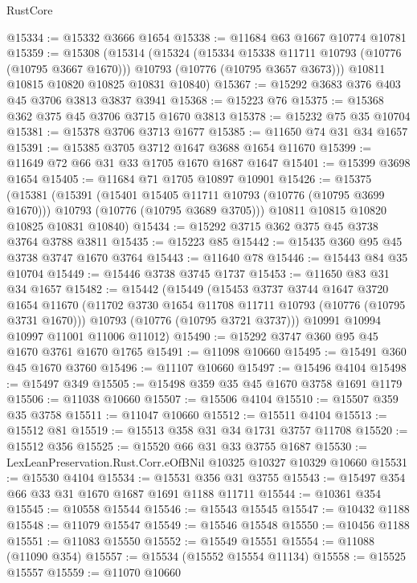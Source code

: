 \begin{lexlean}{RustCore}
\begin{coremodule}
@15334 := @15332 @3666 @1654
@15338 := @11684 @63 @1667 @10774 @10781
@15359 := @15308
    (@15314
      (@15324
        (@15334 @15338 @11711 @10793 (@10776 (@10795 @3667 @1670)))
        @10793
        (@10776 (@10795 @3657 @3673)))
      @10811
      @10815
      @10820
      @10825
      @10831
      @10840)
@15367 := @15292 @3683 @376 @403 @45 @3706 @3813 @3837 @3941
@15368 := @15223 @76
@15375 := @15368 @362 @375 @45 @3706 @3715 @1670 @3813
@15378 := @15232 @75 @35 @10704
@15381 := @15378 @3706 @3713 @1677
@15385 := @11650 @74 @31 @34 @1657
@15391 := @15385 @3705 @3712 @1647 @3688 @1654 @11670
@15399 := @11649 @72 @66 @31 @33 @1705 @1670 @1687 @1647
@15401 := @15399 @3698 @1654
@15405 := @11684 @71 @1705 @10897 @10901
@15426 := @15375
    (@15381
      (@15391
        (@15401 @15405 @11711 @10793 (@10776 (@10795 @3699 @1670)))
        @10793
        (@10776 (@10795 @3689 @3705)))
      @10811
      @10815
      @10820
      @10825
      @10831
      @10840)
@15434 := @15292 @3715 @362 @375 @45 @3738 @3764 @3788 @3811
@15435 := @15223 @85
@15442 := @15435 @360 @95 @45 @3738 @3747 @1670 @3764
@15443 := @11640 @78
@15446 := @15443 @84 @35 @10704
@15449 := @15446 @3738 @3745 @1737
@15453 := @11650 @83 @31 @34 @1657
@15482 := @15442
    (@15449
      (@15453
        @3737
        @3744
        @1647
        @3720
        @1654
        @11670
        (@11702 @3730 @1654 @11708 @11711 @10793 (@10776 (@10795 @3731 @1670)))
        @10793
        (@10776 (@10795 @3721 @3737)))
      @10991
      @10994
      @10997
      @11001
      @11006
      @11012)
@15490 := @15292 @3747 @360 @95 @45 @1670 @3761 @1670 @1765
@15491 := @11098 @10660
@15495 := @15491 @360 @45 @1670 @3760
@15496 := @11107 @10660
@15497 := @15496 @4104
@15498 := @15497 @349
@15505 := @15498 @359 @35 @45 @1670 @3758 @1691 @1179
@15506 := @11038 @10660
@15507 := @15506 @4104
@15510 := @15507 @359 @35 @3758
@15511 := @11047 @10660
@15512 := @15511 @4104
@15513 := @15512 @81
@15519 := @15513 @358 @31 @34 @1731 @3757 @11708
@15520 := @15512 @356
@15525 := @15520 @66 @31 @33 @3755 @1687
@15530 := LexLeanPreservation.Rust.Corr.eOfBNil @10325 @10327 @10329 @10660
@15531 := @15530 @4104
@15534 := @15531 @356 @31 @3755
@15543 := @15497 @354 @66 @33 @31 @1670 @1687 @1691 @1188 @11711
@15544 := @10361 @354
@15545 := @10558 @15544
@15546 := @15543 @15545
@15547 := @10432 @1188
@15548 := @11079 @15547
@15549 := @15546 @15548
@15550 := @10456 @1188
@15551 := @11083 @15550
@15552 := @15549 @15551
@15554 := @11088 (@11090 @354)
@15557 := @15534 (@15552 @15554 @11134)
@15558 := @15525 @15557
@15559 := @11070 @10660

\end{coremodule}
\end{lexlean}
